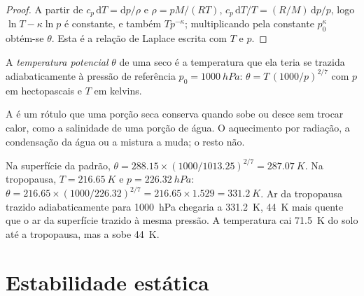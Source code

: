 \begin{proof}
A partir de $c_p\,\mathrm dT = \mathrm dp/\rho$ e $\rho = pM/(RT)$, $c_p\,\mathrm dT/T
= (R/M)\,\mathrm dp/p$, logo $\ln T - \kappa \ln p$ é constante, e também $T
p^{-\kappa}$; multiplicando pela constante $p_0^{\kappa}$ obtém-se $\theta$. Esta é
a relação de Laplace escrita com $T$ e $p$.
\end{proof}

\begin{definition}\label{def:b1:fluid-envelopes-structure:potential-temperature}
A \emph{temperatura potencial} $\theta$ de uma  seco é a
temperatura que ela teria se trazida adiabaticamente à pressão de referência $p_0 = \qty{1000}{hPa}$:
$\theta = T\,(1000/p)^{2/7}$ com $p$ em hectopascais e $T$ em kelvins.
\end{definition}

A  é um rótulo que uma porção seca conserva quando sobe ou desce sem trocar
calor, como a salinidade de uma porção de água. O aquecimento por radiação, a condensação da água
ou a mistura a muda; o resto não.

\begin{example}\label{ex:b1:fluid-envelopes-structure:tropopause}
Na superfície da padrão, $\theta = 288.15 \times (1000/1013.25)^{2/7} =
\qty{287.07}{K}$. Na tropopausa, $T = \qty{216.65}{K}$ e $p =
\qty{226.32}{hPa}$: $\theta = 216.65 \times (1000/226.32)^{2/7} = 216.65 \times
1.529 = \qty{331.2}{K}$. Ar da tropopausa trazido adiabaticamente para \qty{1000}{hPa} chegaria a
\qty{331.2}{K}, \qty{44}{K} mais quente que o ar da superfície trazido à mesma pressão. A
temperatura cai \qty{71.5}{K} do solo até a tropopausa, mas a  sobe
\qty{44}{K}.
\end{example}

\section{Estabilidade estática}\label{sec:b1:fluid-envelopes-structure:stability}

